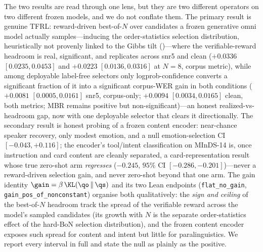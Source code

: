 The two results are read through one lens, but they are two different operators on two different frozen models, and we do not conflate them. The primary result is genuine TFRL: reward-driven best-of-$N$ over candidates a frozen generative omni model actually samples---inducing the order-statistics selection distribution, heuristically not provenly linked to the Gibbs tilt ()---where the verifiable-reward headroom is real, significant, and replicates across snr5 and clean ($+0.0336$ $[0.0235,0.0453]$ and $+0.0223$ $[0.0136,0.0316]$ at $N{=}8$, corpus metric), while among deployable label-free selectors only logprob-confidence converts a significant fraction of it into a significant corpus-WER gain in both conditions ($+0.0081$ $[0.0005,0.0161]$ snr5, corpus-only; $+0.0094$ $[0.0034,0.0165]$ clean, both metrics; MBR remains positive but non-significant)---an honest realized-vs-headroom gap, now with one deployable selector that clears it directionally. The secondary result is honest probing of a frozen content encoder: near-chance speaker recovery, only modest emotion, and a null emotion-selection CI $[-0.043,+0.116]$; the encoder's tool/intent classification on MInDS-14 is, once instruction and card content are cleanly separated, a card-representation result whose true zero-shot arm \emph{regresses} ($-0.245$, $95\%$ CI $[-0.286,-0.201]$)---never a reward-driven selection gain, and never zero-shot beyond that one arm. The gain identity $\gain=\beta\,\KL(\qo\,\|\,\qs)$ and its two Lean endpoints (\texttt{flat\_no\_gain}, \texttt{gain\_pos\_of\_nonconstant}) organise both qualitatively: the \emph{sign and ceiling} of the best-of-$N$ headroom track the spread of the verifiable reward across the model's sampled candidates (its growth with $N$ is the separate order-statistics effect of the hard-BoN selection distribution), and the frozen content encoder exposes such spread for content and intent but little for paralinguistics. We report every interval in full and state the null as plainly as the positive.